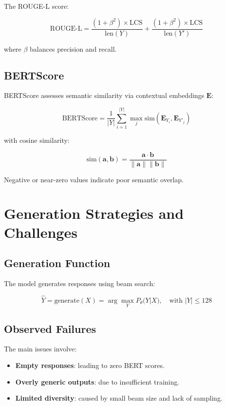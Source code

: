 \documentclass[12pt]{article}
\begin{document}
The ROUGE-L score:

\begin{equation}
\text{ROUGE-L} = \frac{(1 + \beta^2) \times \text{LCS}}{\text{len}(Y)} + \frac{(1 + \beta^2) \times \text{LCS}}{\text{len}(Y')}
\end{equation}

where \( \beta \) balances precision and recall.

\subsection{BERTScore}
BERTScore assesses semantic similarity via contextual embeddings \( \mathbf{E} \):

\begin{equation}
\text{BERTScore} = \frac{1}{|Y|} \sum_{i=1}^{|Y|} \max_{j} \text{sim}(\mathbf{E}_{Y_i}, \mathbf{E}_{Y'_j})
\end{equation}

with cosine similarity:

\begin{equation}
\text{sim}(\mathbf{a}, \mathbf{b}) = \frac{\mathbf{a} \cdot \mathbf{b}}{\|\mathbf{a}\| \|\mathbf{b}\|}
\end{equation}

Negative or near-zero values indicate poor semantic overlap.

\section{Generation Strategies and Challenges}
\subsection{Generation Function}
The model generates responses using beam search:

\begin{equation}
\hat{Y} = \text{generate}(X) = \arg \max_{Y} P_\theta(Y|X), \quad \text{with } |Y| \leq 128
\end{equation}

\subsection{Observed Failures}
The main issues involve:

\begin{itemize}
\item \textbf{Empty responses}: leading to zero BERT scores.
\item \textbf{Overly generic outputs}: due to insufficient training.
\item \textbf{Limited diversity}: caused by small beam size and lack of sampling.
\end{itemize}
\end{document}
